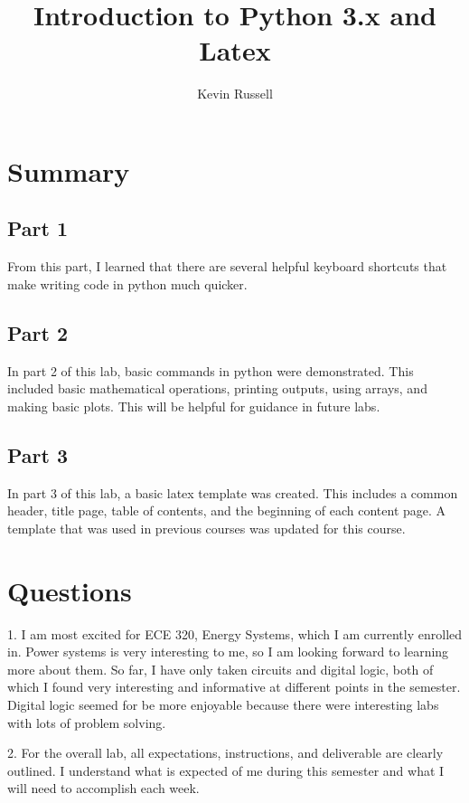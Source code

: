 \documentclass[12pt, titlepage]{article}
\author{Kevin Russell}
\title{Introduction to Python 3.x and Latex}
\date{\parbox{\linewidth}{\centering%
  \experimentDate
  \endgraf\bigskip
  \className\ -- Section \sectionNumber\
}}
\begin{document}
 \newpage
	    \maketitle
    
    \newpage
        \tableofcontents
    
    \newpage
        \section{Summary}
        \subsection{Part 1}
        From this part, I learned that there are several helpful keyboard shortcuts that make writing code in python much quicker.
        
        \subsection{Part 2}
        In part 2 of this lab, basic commands in python were demonstrated.  This included basic mathematical operations, printing outputs, using arrays, and making basic plots.  This will be helpful for guidance in future labs.
        
        \subsection{Part 3}
        In part 3 of this lab, a basic latex template was created.  This includes a common header, title page, table of contents, and the beginning of each content page.  A template that was used in previous courses was updated for this course.
        
    \newpage    
        \section{Questions}
        
        1.  I am most excited for ECE 320, Energy Systems, which I am currently enrolled in.  Power systems is very interesting to me, so I am looking forward to learning more about them.  So far, I have only taken circuits and digital logic, both of which I found very interesting and informative at different points in the semester.  Digital logic seemed for be more enjoyable because there were interesting labs with lots of problem solving.
        
        2.  For the overall lab, all expectations, instructions, and deliverable are clearly outlined.  I understand what is expected of me during this semester and what I will need to accomplish each week.
        
\end{document}
